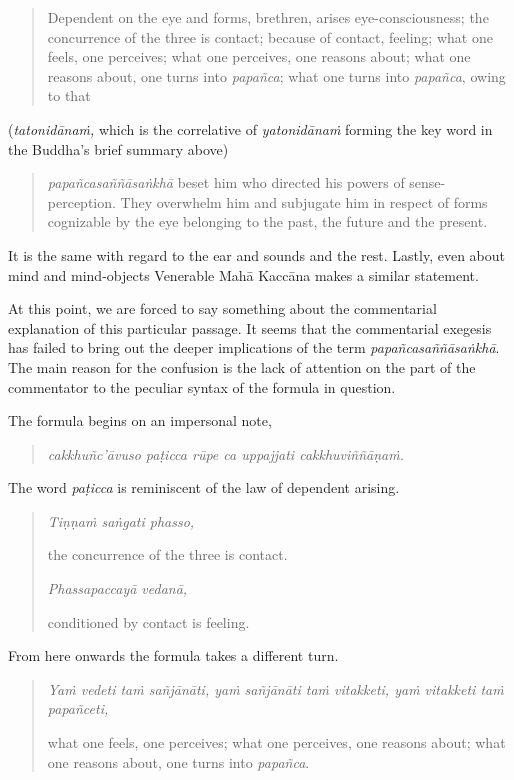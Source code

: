 \begin{quote}
Dependent on the eye and forms, brethren, arises eye-consciousness; the concurrence of the three is contact; because of contact, feeling; what one feels, one perceives; what one perceives, one reasons about; what one reasons about, one turns into \emph{papañca}; what one turns into \emph{papañca}, owing to that
\end{quote}

(\emph{tatonidānaṁ,} which is the correlative of \emph{yatonidānaṁ} forming the key word in the Buddha's brief summary above)

\begin{quote}
\emph{papañcasaññāsaṅkhā} beset him who directed his powers of sense-perception. They overwhelm him and subjugate him in respect of forms cognizable by the eye belonging to the past, the future and the present.
\end{quote}

It is the same with regard to the ear and sounds and the rest. Lastly, even about mind and mind-objects Venerable Mahā Kaccāna makes a similar statement.

At this point, we are forced to say something about the commentarial explanation of this particular passage. It seems that the commentarial exegesis has failed to bring out the deeper implications of the term \emph{papañcasaññāsaṅkhā}. The main reason for the confusion is the lack of attention on the part of the commentator to the peculiar syntax of the formula in question.

The formula begins on an impersonal note,

\begin{quote}
\emph{cakkhuñc'āvuso paṭicca rūpe ca uppajjati cakkhuviññāṇaṁ.}
\end{quote}

The word \emph{paṭicca} is reminiscent of the law of dependent arising.

\begin{quote}
\emph{Tiṇṇaṁ saṅgati phasso,}

the concurrence of the three is contact.

\emph{Phassapaccayā vedanā,}

conditioned by contact is feeling.
\end{quote}

From here onwards the formula takes a different turn.

\begin{quote}
\emph{Yaṁ vedeti taṁ sañjānāti, yaṁ sañjānāti taṁ vitakketi, yaṁ vitakketi taṁ papañceti,}

what one feels, one perceives; what one perceives, one reasons about; what one reasons about, one turns into \emph{papañca}.
\end{quote}


